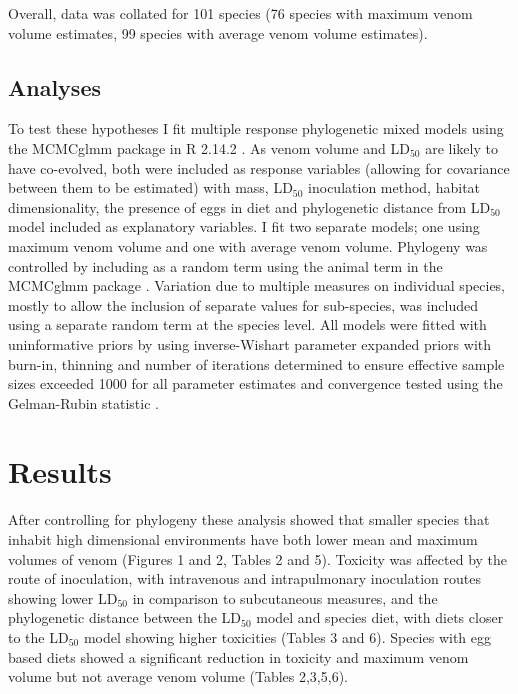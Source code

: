 Overall, data was collated for 101 species (76 species with maximum venom volume estimates, 99 species with average venom volume estimates).


\subsection{Analyses}

To test these hypotheses I fit multiple response phylogenetic mixed models using the MCMCglmm package \citep{hadfield2010mcmc} in R 2.14.2 \citep{RCran}. As venom volume and LD$_{50}$ are likely to have co-evolved, both were included as response variables (allowing for covariance between them to be estimated) with mass, LD$_{50}$ inoculation method, habitat dimensionality, the presence of eggs in diet and phylogenetic distance from LD$_{50}$ model included as explanatory variables. I fit two separate models; one using maximum venom volume and one with average venom volume. Phylogeny was controlled by including as a random term using the animal term in the MCMCglmm package \citep{hadfield2010mcmc}. Variation due to multiple measures on individual species, mostly to allow the inclusion of separate values for sub-species, was included using a separate random term at the species level. All models were fitted with uninformative priors by using inverse-Wishart parameter expanded priors \citep{hadfield2010mcmc} with burn-in, thinning and number of iterations determined to ensure effective sample sizes exceeded 1000 for all parameter estimates and convergence tested using the Gelman-Rubin statistic \citep{gelman1992inference}. 

\section{Results}

After controlling for phylogeny these analysis showed that smaller species that inhabit high dimensional environments have both lower mean and maximum volumes of venom (Figures 1 and 2, Tables 2 and 5). Toxicity was affected by the route of inoculation, with intravenous and intrapulmonary inoculation routes showing lower LD$_{50}$ in comparison to subcutaneous measures, and the phylogenetic distance between the LD$_{50}$ model and species diet, with diets closer to the LD$_{50}$ model showing higher toxicities (Tables 3 and 6). Species with egg based diets showed a significant reduction in toxicity and maximum venom volume but not average venom volume (Tables 2,3,5,6).




